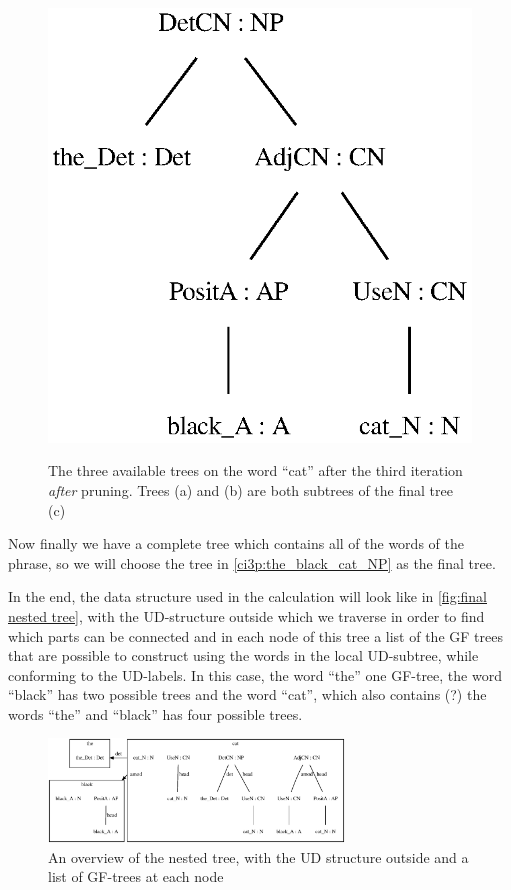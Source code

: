 \begin{figure}
        {\includegraphics[scale=0.75]{thesis/figure/black_cats/the_black_cat_NP_gf.eps}}
    \caption{The three available trees on the word ``cat'' after the third iteration \emph{after} pruning. Trees (a) and (b) are both subtrees of the final tree (c)}\label{fig:cat iter 3 pruned}
\end{figure}

Now finally we have a complete tree which contains all of the words of the phrase, so we will choose the tree in \autoref{ci3p:the_black_cat_NP} as the final tree. 

In the end, the data structure used in the calculation will look like in \autoref{fig:final nested tree}, with the UD-structure outside which we traverse in order to find which parts can be connected and in each node of this tree a list of the GF trees that are possible to construct using the words in the local UD-subtree, while conforming to the UD-labels. In this case, the word ``the'' one GF-tree, the word ``black'' has two possible trees and the word ``cat'', which also contains (?) the words ``the'' and ``black'' has four possible trees. 

\begin{figure}
    \centering
    \includegraphics[width=0.7\textwidth]{figure/black_cats/the_black_cat_graph}
    \caption{An overview of the nested tree, with the UD structure outside and a list of GF-trees at each node}\label{fig:final nested tree}
\end{figure}


